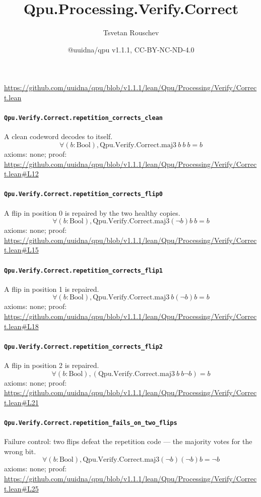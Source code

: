 \documentclass[11pt]{article}
\title{Qpu.Processing.Verify.Correct}
\author{Tsvetan Rouschev}
\date{@uuidna/qpu v1.1.1, CC-BY-NC-ND-4.0}
\begin{document}
\maketitle
\noindent\url{https://github.com/uuidna/qpu/blob/v1.1.1/lean/Qpu/Processing/Verify/Correct.lean}

\paragraph{\texttt{Qpu.Verify.Correct.repetition\_corrects\_clean}}
A clean codeword decodes to itself.
\[ \forall (b : \mathrm{Bool}), \mathrm{Qpu.Verify.Correct.maj3}\ b\ b\ b = b \]
\noindent axioms: none; proof: \url{https://github.com/uuidna/qpu/blob/v1.1.1/lean/Qpu/Processing/Verify/Correct.lean\#L12}

\paragraph{\texttt{Qpu.Verify.Correct.repetition\_corrects\_flip0}}
A flip in position 0 is repaired by the two healthy copies.
\[ \forall (b : \mathrm{Bool}), \mathrm{Qpu.Verify.Correct.maj3} (\neg b) b\ b = b \]
\noindent axioms: none; proof: \url{https://github.com/uuidna/qpu/blob/v1.1.1/lean/Qpu/Processing/Verify/Correct.lean\#L15}

\paragraph{\texttt{Qpu.Verify.Correct.repetition\_corrects\_flip1}}
A flip in position 1 is repaired.
\[ \forall (b : \mathrm{Bool}), \mathrm{Qpu.Verify.Correct.maj3}\ b (\neg b) b = b \]
\noindent axioms: none; proof: \url{https://github.com/uuidna/qpu/blob/v1.1.1/lean/Qpu/Processing/Verify/Correct.lean\#L18}

\paragraph{\texttt{Qpu.Verify.Correct.repetition\_corrects\_flip2}}
A flip in position 2 is repaired.
\[ \forall (b : \mathrm{Bool}), (\mathrm{Qpu.Verify.Correct.maj3}\ b\ b \neg b) = b \]
\noindent axioms: none; proof: \url{https://github.com/uuidna/qpu/blob/v1.1.1/lean/Qpu/Processing/Verify/Correct.lean\#L21}

\paragraph{\texttt{Qpu.Verify.Correct.repetition\_fails\_on\_two\_flips}}
Failure control: two flips defeat the repetition code — the majority votes for the wrong bit.
\[ \forall (b : \mathrm{Bool}), \mathrm{Qpu.Verify.Correct.maj3} (\neg b) (\neg b) b = \neg b \]
\noindent axioms: none; proof: \url{https://github.com/uuidna/qpu/blob/v1.1.1/lean/Qpu/Processing/Verify/Correct.lean\#L25}
\end{document}
